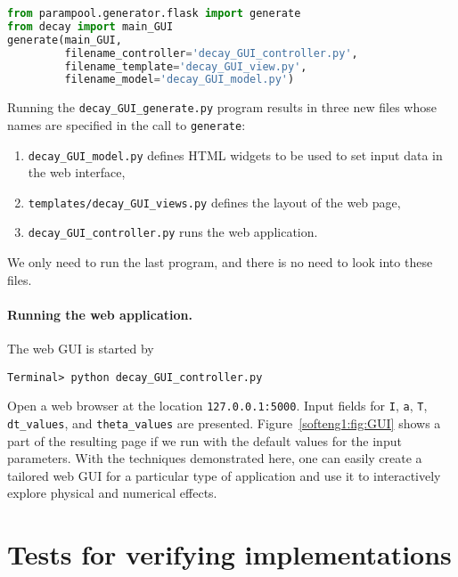 \documentclass[graybox,sectrefs,envcountresetchap,open=right,final]{svmonodo}
\begin{document}
\begin{lstlisting}[language=Python,style=blue1bar_bluegreen]
from parampool.generator.flask import generate
from decay import main_GUI
generate(main_GUI,
         filename_controller='decay_GUI_controller.py',
         filename_template='decay_GUI_view.py',
         filename_model='decay_GUI_model.py')
\end{lstlisting}
Running the \Verb!decay_GUI_generate.py! program results in three new
files whose names are specified in the call to \texttt{generate}:

\begin{enumerate}
 \item \Verb!decay_GUI_model.py! defines HTML widgets to be used to set
    input data in the web interface,

 \item \Verb!templates/decay_GUI_views.py! defines the layout of the web page,

 \item \Verb!decay_GUI_controller.py! runs the web application.
\end{enumerate}

\noindent
We only need to run the last program, and there is no need to look into
these files.

\paragraph{Running the web application.}
The web GUI is started by

\begin{Verbatim}[frame=lines,label=\fbox{{\tiny Terminal}},framesep=2.5mm,framerule=0.7pt,fontsize=\fontsize{9pt}{9pt}]
Terminal> python decay_GUI_controller.py
\end{Verbatim}
Open a web browser at the location \texttt{127.0.0.1:5000}. Input fields for
\texttt{I}, \texttt{a}, \texttt{T}, \Verb!dt_values!, and \Verb!theta_values! are presented.  Figure~\ref{softeng1:fig:GUI} shows a part of the resulting page if we run
with the default values for the input parameters.
With the techniques demonstrated here, one can
easily create a tailored web GUI for a particular type of application
and use it to interactively explore physical and numerical effects.

\section{Tests for verifying implementations}
\label{softeng1:verify}
\end{document}
